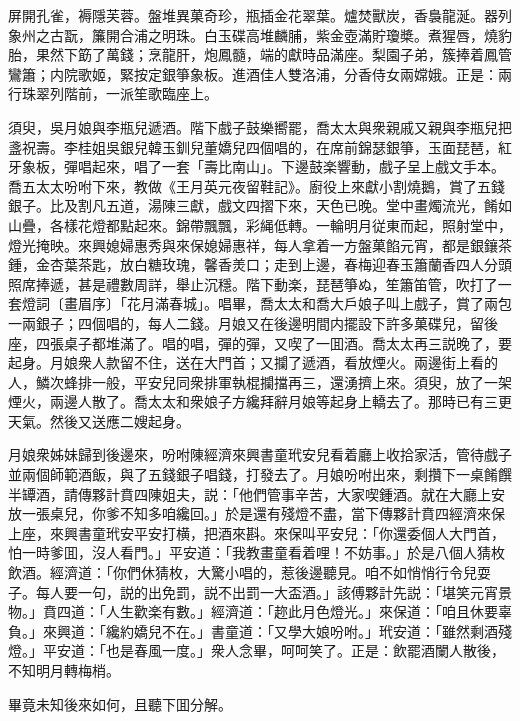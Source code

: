 \begin{myquote}
屏開孔雀，褥隱芙蓉。盤堆異菓奇珍，瓶插金花翠葉。爐焚獸炭，香裊龍涎。器列象州之古翫，簾開合浦之明珠。白玉碟高堆麟脯，紫金壺滿貯瓊槳。煮猩唇，燒豹胎，果然下筯了萬錢；烹龍肝，炮鳳髓，端的獻時品滿座。梨園子弟，簇捧着鳳管鸞簫；内院歌姬，緊按定銀箏象板。進酒佳人雙洛浦，分香侍女兩嫦娥。正是：兩行珠翠列階前，一派笙歌臨座上。
\end{myquote}

須臾，吳月娘與李瓶兒遞酒。階下戲子鼓樂嚮罷，喬太太與衆親戚又親與李瓶兒把盞祝壽。李桂姐吳銀兒韓玉釧兒董嬌兒四個唱的，在席前錦瑟銀箏，玉面琵琶，紅牙象板，彈唱起來，唱了一套「壽比南山」。下邊鼓楽響動，戲子呈上戲文手本。喬五太太吩咐下來，教做《王月英元夜留鞋記》。廚役上來獻小割燒鵝，賞了五錢銀子。比及割凡五道，湯陳三獻，戲文四摺下來，天色已晚。堂中畫燭流光，餚如山疊，各樣花燈都點起來。錦帶飄飄，彩䋲低轉。一輪明月従東而起，照射堂中，燈光掩映。來興媳婦惠秀與來保媳婦惠祥，每人拿着一方盤菓餡元宵，都是銀鑲茶鍾，金杏葉茶匙，放白糖玫瑰，馨香羙口；走到上邊，春梅迎春玉簫蘭香四人分頭照席捧遞，甚是禮數周詳，舉止沉穩。階下動楽，琵琶箏ぬ，笙簫笛管，吹打了一套燈詞〔畫眉序〕「花月滿春城」。唱畢，喬太太和喬大戶娘子叫上戲子，賞了兩包一兩銀子；四個唱的，每人二錢。月娘又在後邊明間内擺設下許多菓碟兒，留後座，四張桌子都堆滿了。唱的唱，彈的彈，又喫了一囬酒。喬太太再三説晚了，要起身。月娘衆人款留不住，送在大門首；又攔了遞酒，看放煙火。兩邊街上看的人，鱗次蜂排一般，平安兒同衆排軍執棍攔擋再三，還湧擠上來。須臾，放了一架煙火，兩邊人散了。喬太太和衆娘子方纔拜辭月娘等起身上轎去了。那時已有三更天氣。然後又送應二嫂起身。

月娘衆姊妹歸到後邊來，吩咐陳經濟來興書童玳安兒看着廳上收拾家活，管待戲子並兩個師範酒飯，與了五錢銀子唱錢，打發去了。月娘吩咐出來，剩攢下一桌餚饌半罈酒，請傳夥計賁四陳姐夫，説：「他們管事辛苦，大家喫鍾酒。就在大廳上安放一張桌兒，你爹不知多咱纔回。」於是還有殘燈不盡，當下傳夥計賁四經濟來保上座，來興書童玳安平安打横，把酒來斟。來保叫平安兒：「你還委個人大門首，怕一時爹囬，沒人看門。」平安道：「我教畫童看着哩！不妨事。」於是八個人猜枚飲酒。經濟道：「你們休猜枚，大驚小唱的，惹後邊聽見。咱不如悄悄行令兒耍子。每人要一句，説的出免罰，説不出罰一大盃酒。」該傅夥計先説：「堪笑元宵景物。」賁四道：「人生歡楽有數。」經濟道：「趂此月色燈光。」來保道：「咱且休要辜負。」來興道：「纔約嬌兒不在。」書童道：「又學大娘吩咐。」玳安道：「雖然剩酒殘燈。」平安道：「也是春風一度。」衆人念畢，呵呵笑了。正是：飲罷酒闌人散後，不知明月轉梅梢。

畢竟未知後來如何，且聽下囬分解。

